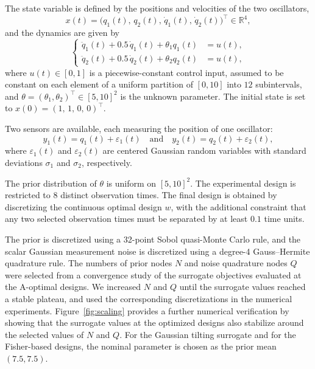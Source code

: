 \documentclass[a4paper,11pt]{article}
\begin{document}
The state variable is defined by the positions and velocities of the two oscillators,
\[
x(t)=\bigl(q_1(t),\,q_2(t),\,\dot q_1(t),\,\dot q_2(t)\bigr)^\top \in \mathbb{R}^4,
\]
and the dynamics are given by
\begin{equation}
\left\{
\begin{aligned}
\ddot q_1(t) + 0.5\,\dot q_1(t) + \theta_1 q_1(t) &= u(t),\\
\ddot q_2(t) + 0.5\,\dot q_2(t) + \theta_2 q_2(t) &= u(t),
\end{aligned}
\right.
\end{equation}
where \(u(t)\in[0,1]\) is a piecewise-constant control input, assumed to be constant on each element of a uniform partition of \([0,10]\) into \(12\) subintervals, and \(\theta = (\theta_1,\theta_2)^\top \in [5,10]^2\)
is the unknown parameter. The initial state is set to
\(x(0) = (1,\,1,\,0,\,0)^\top.\)

Two sensors are available, each measuring the position of one oscillator:
\begin{equation}
y_1(t) = q_1(t) + \varepsilon_{1}(t)
\quad\text{and}\quad
y_2(t) = q_2(t) + \varepsilon_{2}(t),
\end{equation}
where \(\varepsilon_{1}(t)\) and \(\varepsilon_{2}(t)\) are centered Gaussian random variables with standard deviations \(\sigma_1\) and \(\sigma_2\), respectively.

The prior distribution of \(\theta\) is uniform on \([5,10]^2\). The experimental design is restricted to \(8\) distinct observation times. The final design is obtained by discretizing the continuous optimal design \(w\), with the additional constraint that any two selected observation times must be separated by at least \(0.1\) time units.

The prior is discretized using a 32-point Sobol quasi-Monte Carlo rule, and
the scalar Gaussian measurement noise is discretized using a degree-4
Gauss--Hermite quadrature rule. The numbers of prior nodes \(N\) and noise quadrature nodes \(Q\) were
selected from a convergence study of the surrogate objectives evaluated
at the A-optimal designs. We increased \(N\) and \(Q\) until the surrogate
values reached a stable plateau, and used the corresponding discretizations
in the numerical experiments. Figure~\ref{fig:scaling} provides a further numerical
verification by showing that the surrogate values at the optimized designs
also stabilize around the selected values of \(N\) and \(Q\). For the Gaussian tilting surrogate and for the Fisher-based designs, the nominal parameter is chosen as the prior mean \((7.5,7.5)\). 
\end{document}
